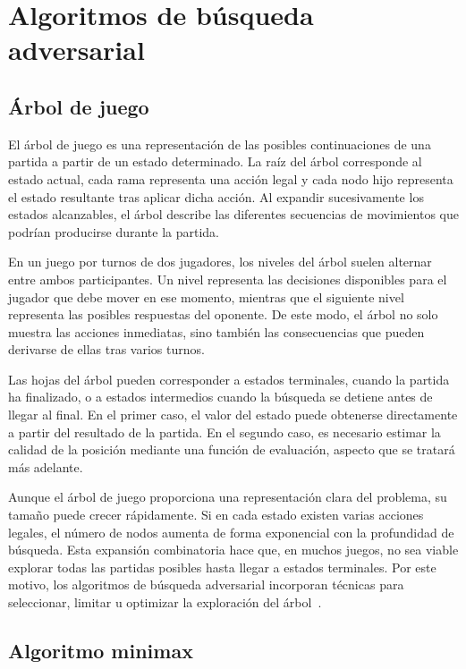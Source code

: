 \section{Algoritmos de búsqueda adversarial}
\label{sec:algoritmos-busqueda-adversarial}

\subsection{Árbol de juego}

El árbol de juego es una representación de las posibles continuaciones de una partida a partir de un estado determinado. La raíz del árbol corresponde al estado actual, cada rama representa una acción legal y cada nodo hijo representa el estado resultante tras aplicar dicha acción. Al expandir sucesivamente los estados alcanzables, el árbol describe las diferentes secuencias de movimientos que podrían producirse durante la partida.

En un juego por turnos de dos jugadores, los niveles del árbol suelen alternar entre ambos participantes. Un nivel representa las decisiones disponibles para el jugador que debe mover en ese momento, mientras que el siguiente nivel representa las posibles respuestas del oponente. De este modo, el árbol no solo muestra las acciones inmediatas, sino también las consecuencias que pueden derivarse de ellas tras varios turnos.

Las hojas del árbol pueden corresponder a estados terminales, cuando la partida ha finalizado, o a estados intermedios cuando la búsqueda se detiene antes de llegar al final. En el primer caso, el valor del estado puede obtenerse directamente a partir del resultado de la partida. En el segundo caso, es necesario estimar la calidad de la posición mediante una función de evaluación, aspecto que se tratará más adelante.

Aunque el árbol de juego proporciona una representación clara del problema, su tamaño puede crecer rápidamente. Si en cada estado existen varias acciones legales, el número de nodos aumenta de forma exponencial con la profundidad de búsqueda. Esta expansión combinatoria hace que, en muchos juegos, no sea viable explorar todas las partidas posibles hasta llegar a estados terminales. Por este motivo, los algoritmos de búsqueda adversarial incorporan técnicas para seleccionar, limitar u optimizar la exploración del árbol~\cite{russell2020aima,poole2023foundations}.


\subsection{Algoritmo minimax}


